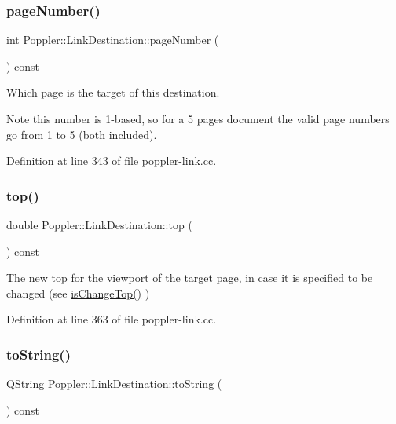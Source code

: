 \subsubsection{\texorpdfstring{page\+Number()}{pageNumber()}}
{\footnotesize\ttfamily int Poppler\+::\+Link\+Destination\+::page\+Number (\begin{DoxyParamCaption}{ }\end{DoxyParamCaption}) const}

Which page is the target of this destination.

\begin{DoxyNote}{Note}
this number is 1-\/based, so for a 5 pages document the valid page numbers go from 1 to 5 (both included). 
\end{DoxyNote}


Definition at line 343 of file poppler-\/link.\+cc.

\mbox{\label{class_poppler_1_1_link_destination_ab890fec31bee5e967c56b443b068f62f}} 
\subsubsection{\texorpdfstring{top()}{top()}}
{\footnotesize\ttfamily double Poppler\+::\+Link\+Destination\+::top (\begin{DoxyParamCaption}{ }\end{DoxyParamCaption}) const}

The new top for the viewport of the target page, in case it is specified to be changed (see \hyperlink{class_poppler_1_1_link_destination_a477b631b2f1c8bb36813ff49776d331f}{is\+Change\+Top()} ) 

Definition at line 363 of file poppler-\/link.\+cc.

\mbox{\label{class_poppler_1_1_link_destination_a66d3b538d8164c3ea923416fc07a0436}} 
\subsubsection{\texorpdfstring{to\+String()}{toString()}}
{\footnotesize\ttfamily Q\+String Poppler\+::\+Link\+Destination\+::to\+String (\begin{DoxyParamCaption}{ }\end{DoxyParamCaption}) const}

